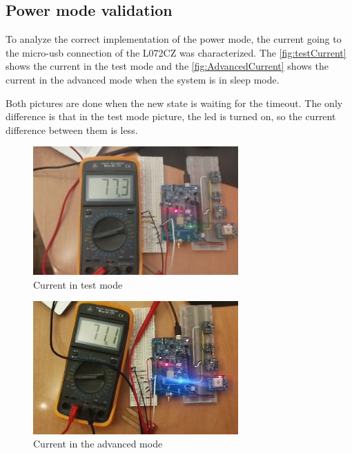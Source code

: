 \subsection{Power mode validation}
To analyze the correct implementation of the power mode, the current going to the micro-usb connection of the L072CZ was characterized. The \autoref{fig:testCurrent} shows the current in the test mode and the \autoref{fig:AdvancedCurrent} shows the current in the advanced mode when 
the system is in sleep mode. 

Both pictures are done when the new state is waiting for the timeout. The only difference is that in the test mode picture, the led is turned on, so the current difference between them is less.
\begin{figure}[H]
    \centering
    \includegraphics[width=0.7\textwidth]{images/7/Test2.png}
    \caption{Current in test mode}
    \label{fig:testCurrent}
\end{figure}
\begin{figure}[H]
    \centering
    \includegraphics[width=0.7\textwidth]{images/7/Advanced.png}
    \caption{Current in the advanced mode}
    \label{fig:AdvancedCurrent}
\end{figure}